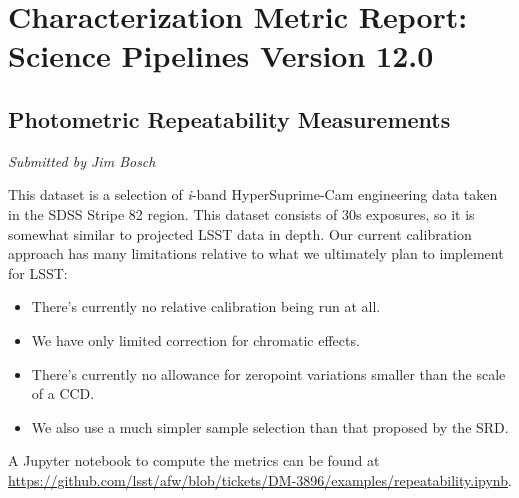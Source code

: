 \section{Characterization Metric Report: Science Pipelines Version
12.0}\label{characterization-metric-report-science-pipelines-version-12.0}

\subsection{Photometric Repeatability
Measurements}\label{photometric-repeatability-measurements}

\emph{Submitted by Jim Bosch}

This dataset is a selection of \emph{i}-band HyperSuprime-Cam
engineering data taken in the SDSS Stripe 82 region. This dataset
consists of 30s exposures, so it is somewhat similar to projected LSST
data in depth. Our current calibration approach has many limitations
relative to what we ultimately plan to implement for LSST:

\begin{itemize}
\tightlist
\item
  There's currently no relative calibration being run at all.
\item
  We have only limited correction for chromatic effects.
\item
  There's currently no allowance for zeropoint variations smaller than
  the scale of a CCD.
\item
  We also use a much simpler sample selection than that proposed by the
  SRD.
\end{itemize}

A Jupyter notebook to compute the metrics can be found at
\url{https://github.com/lsst/afw/blob/tickets/DM-3896/examples/repeatability.ipynb}.

